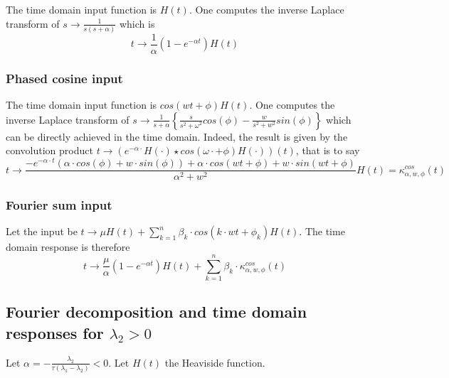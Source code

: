 \documentclass[preprint]{elsarticle}
\begin{document}
The time domain input function is $H\left(t\right)$. One computes
the inverse Laplace transform of $s\rightarrow\frac{1}{s\left(s+\alpha\right)}$
which is 
\[
t\rightarrow\frac{1}{\alpha}\left(1-e^{-\alpha t}\right)H\left(t\right)
\]



\subsubsection{Phased cosine input}

The time domain input function is $cos\left(wt+\phi\right)H\left(t\right)$.
One computes the inverse Laplace transform of $s\rightarrow\frac{1}{s+\alpha}\left\{ \frac{s}{s^{2}+\omega^{2}}cos\left(\phi\right)-\frac{w}{s^{2}+w^{2}}sin\left(\phi\right)\right\} $
which can be directly achieved in the time domain. Indeed, the result
is given by the convolution product $t\rightarrow\left(e^{-\alpha\cdot}H\left(\cdot\right)\star cos\left(\omega\cdot+\phi\right)H\left(\cdot\right)\right)\left(t\right)$,
that is to say 
\[
t\rightarrow\frac{-e^{-\alpha\cdot t}\left(\alpha\cdot cos\left(\phi\right)+w\cdot sin\left(\phi\right)\right)+\alpha\cdot cos\left(wt+\phi\right)+w\cdot sin\left(wt+\phi\right)}{\alpha^{2}+w^{2}}H\left(t\right)=\kappa_{\alpha,w,\phi}^{cos}\left(t\right)
\]



\subsubsection{Fourier sum input}

Let the input be $t\rightarrow\mu H\left(t\right)+\sum_{k=1}^{n}\beta_{k}\cdot cos\left(k\cdot wt+\phi_{k}\right)H\left(t\right)$.
The time domain response is therefore 
\[
t\rightarrow\frac{\mu}{\alpha}\left(1-e^{-\alpha t}\right)H\left(t\right)+\sum_{k=1}^{n}\beta_{k}\cdot\kappa_{\alpha,w,\phi}^{cos}\left(t\right)
\]



\subsection{Fourier decomposition and time domain responses for $\lambda_{2}>0$}

Let $\alpha=-\frac{\lambda_{2}}{\tau\left(\lambda_{1}-\lambda_{2}\right)}<0$.
Let $H\left(t\right)$ the Heaviside function.
\end{document}
